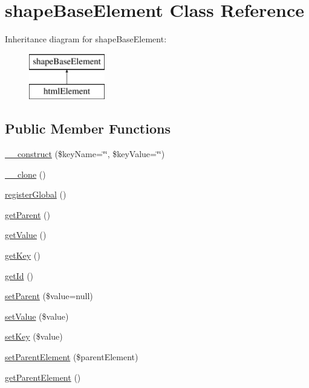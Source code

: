 \hypertarget{classshapeBaseElement}{}\section{shape\+Base\+Element Class Reference}
\label{classshapeBaseElement}
Inheritance diagram for shape\+Base\+Element\+:\begin{figure}[H]
\begin{center}
\leavevmode
\includegraphics[height=2.000000cm]{classshapeBaseElement}
\end{center}
\end{figure}
\subsection*{Public Member Functions}
\begin{DoxyCompactItemize}
\item 
\hyperlink{classshapeBaseElement_a36980020a9e2e1ab0079b7c6abad349e}{\+\_\+\+\_\+construct} (\$key\+Name=\char`\"{}\char`\"{}, \$key\+Value=\char`\"{}\char`\"{})
\item 
\hyperlink{classshapeBaseElement_af4b541a30cda2b49b6dbf1a3fddec344}{\+\_\+\+\_\+clone} ()
\item 
\hyperlink{classshapeBaseElement_a4547c40cb33c3d34f16a262d1dcca069}{register\+Global} ()
\item 
\hyperlink{classshapeBaseElement_a19aff5da3dce4162e9b6f60226bf1a2c}{get\+Parent} ()
\item 
\hyperlink{classshapeBaseElement_ad6ebb79ad6cb2d501f682938d15d4052}{get\+Value} ()
\item 
\hyperlink{classshapeBaseElement_acc89cd4c440d11f1b771410a096db6c9}{get\+Key} ()
\item 
\hyperlink{classshapeBaseElement_a2ed3481fc7f26976cab34075a9fe7215}{get\+Id} ()
\item 
\hyperlink{classshapeBaseElement_a2549412d8c70edfd3c43d9aa84da49df}{set\+Parent} (\$value=null)
\item 
\hyperlink{classshapeBaseElement_a6353680d2dc0774c53f18050d8bf0df3}{set\+Value} (\$value)
\item 
\hyperlink{classshapeBaseElement_a2d50596a8a0e07ad66401e7c680ec68a}{set\+Key} (\$value)
\item 
\hyperlink{classshapeBaseElement_abbfca908d37f102e4a8e7b353c643d68}{set\+Parent\+Element} (\$parent\+Element)
\item 
\hyperlink{classshapeBaseElement_a091d09076b19adff193a373d3d00b6d8}{get\+Parent\+Element} ()
\end{DoxyCompactItemize}


